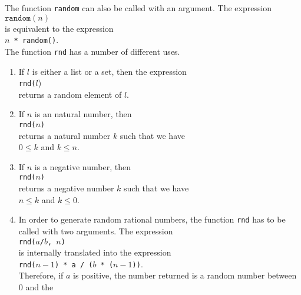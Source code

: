 The function \texttt{random} can also be called with an argument.  The expression
\\[0.2cm]
\hspace*{1.3cm}
$\texttt{random}(n)$
\\[0.2cm]
is equivalent to the expression
\\[0.2cm]
\hspace*{1.3cm}
\texttt{$n$ * random()}.
\\[0.2cm]
The function \texttt{rnd} has a number of different uses.  
\begin{enumerate}
\item If $l$ is either a list or a set, then the expression
      \\[0.2cm]
      \hspace*{1.3cm}
      \texttt{rnd($l$})
      \\[0.2cm]
      returns a random element of $l$.
\item If $n$ is an natural number, then 
      \\[0.2cm]
      \hspace*{1.3cm}
      \texttt{rnd($n$)}
      \\[0.2cm]
      returns a natural number $k$ such that we have
      \\[0.2cm]
      \hspace*{1.3cm}
      $0 \leq k$ and $k \leq n$.
\item If $n$ is a negative number, then 
      \\[0.2cm]
      \hspace*{1.3cm}
      \texttt{rnd($n$)}
      \\[0.2cm]
      returns a negative number $k$ such that we have
      \\[0.2cm]
      \hspace*{1.3cm}
      $n \leq k$ \quad and \quad $k \leq 0$.
\item In order to generate random rational numbers, the function \texttt{rnd} has to be called with
      two arguments.  The expression
      \\[0.2cm]
      \hspace*{1.3cm}
      \texttt{rnd($a$/$b$, $n$)}
      \\[0.2cm]
      is internally translated into the expression
      \\[0.2cm]
      \hspace*{1.3cm}
      \texttt{rnd($n-1$) * a / ($b$ * ($n-1$))}.
      \\[0.2cm]
      Therefore, if $a$ is positive, the number returned is a random number between $0$ and the

\end{enumerate}
